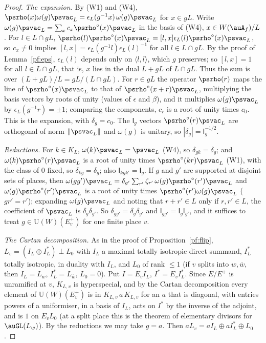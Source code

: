 \documentclass[10pt]{amsart}
\theoremstyle{definition}
\theoremstyle{remark}
\providecommand{\auU}{\mathrm U}
\providecommand{\aubar}[1]{\overline{#1}}
\begin{document}
\begin{proof}
\emph{The expansion.} By (W1) and (W4), $\psrho(x)\omega(g)\psvac_L=\epsilon_L(g^{-1}x)\,\omega(g)\psvac_L$ for
$x\in gL$. Write $\omega(g)\psvac_L=\sum_xc_x\psrho^\circ(x)\psvac_L$ in the basis of (W4), $x\in W(\auA_f)/L$.
For $l\in L\cap gL$, $\psrho(l)\psrho^\circ(x)\psvac_L=[l,x]\epsilon_L(l)\psrho^\circ(x)\psvac_L$, so
$c_x\ne0$ implies $[l,x]=\epsilon_L(g^{-1}l)\epsilon_L(l)^{-1}$ for all $l\in L\cap gL$. By the proof of
Lemma~\ref{pf:eps}, $\epsilon_L(l)$ depends only on $\langle l,l\rangle$, which $g$ preserves; so
$[l,x]=1$ for all $l\in L\cap gL$, that is, $x$ lies in the dual $L+gL$ of $L\cap gL$. Thus the sum is over
$(L+gL)/L=gL/(L\cap gL)$. For $r\in gL$ the operator $\psrho(r)$ maps the line of
$\psrho^\circ(x)\psvac_L$ to that of $\psrho^\circ(x+r)\psvac_L$, multiplying the basis vectors by roots of
unity (values of $\epsilon$ and $\beta$), and it multiplies $\omega(g)\psvac_L$ by $\epsilon_L(g^{-1}r)=\pm1$;
comparing the components, $c_r$ is a root of unity times $c_0$. This is the expansion, with
$\delta_g=c_0$. The $\mathsf I_g$ vectors $\psrho^\circ(r)\psvac_L$ are orthogonal of norm $\|\psvac_L\|$
and $\omega(g)$ is unitary, so $|\delta_g|=\mathsf I_g^{-1/2}$.

\emph{Reductions.} For $k\in K_L$, $\omega(k)\psvac_L=\psvac_L$ (W4), so $\delta_{gk}=\delta_g$; and
$\omega(k)\psrho^\circ(r)\psvac_L$ is a root of unity times $\psrho^\circ(kr)\psvac_L$ (W1), with the class
of $0$ fixed, so $\delta_{kg}=\delta_g$; also $\mathsf I_{kgk'}=\mathsf I_g$. If $g$ and $g'$ are supported at
disjoint sets of places, then $\omega(gg')\psvac_L=\delta_{g'}\sum_{r'}\zeta_{r'}\,\omega(g)\psrho^\circ(r')
\psvac_L$ and $\omega(g)\psrho^\circ(r')\psvac_L$ is a root of unity times $\psrho^\circ(r')\omega(g)\psvac_L$
($gr'=r'$); expanding $\omega(g)\psvac_L$ and noting that $r+r'\in L$ only if $r,r'\in L$, the coefficient of
$\psvac_L$ is $\delta_g\delta_{g'}$. So $\delta_{gg'}=\delta_g\delta_{g'}$ and $\mathsf I_{gg'}=\mathsf I_g
\mathsf I_{g'}$, and it suffices to treat $g\in\auU(W)(E^+_v)$ for one finite place $v$.

\emph{The Cartan decomposition.} As in the proof of Proposition~\ref{pf:flip}, $L_v=(I_L\oplus I_L^*)\perp
L_0$ with $I_L$ a maximal totally isotropic direct summand, $I_L^*$ totally isotropic, in duality with
$I_L$, and $L_0$ of rank $\le1$ (if $v$ splits into $w,\aubar w$, then $I_L=L_w$, $I_L^*=L_{\aubar w}$,
$L_0=0$). Put $I=E_vI_L$, $I^*=E_vI_L^*$. Since $E/E^+$ is unramified at $v$, $K_{L,v}$ is hyperspecial,
and by the Cartan decomposition \cite[\S3.3.3]{TitsCorvallis} every element of $\auU(W)(E^+_v)$ is in
$K_{L,v}\,a\,K_{L,v}$ for an $a$ that is diagonal, with entries powers of a uniformiser, in a basis of
$I_L$, acts on $I^*$ by the inverse of the adjoint, and is $1$ on $E_vL_0$ (at a split place this is the
theorem of elementary divisors for $\auGL(L_w)$). By the reductions we may take $g=a$. Then
$aL_v=aI_L\oplus aI_L^*\oplus L_0$.


\end{proof}
\end{document}

